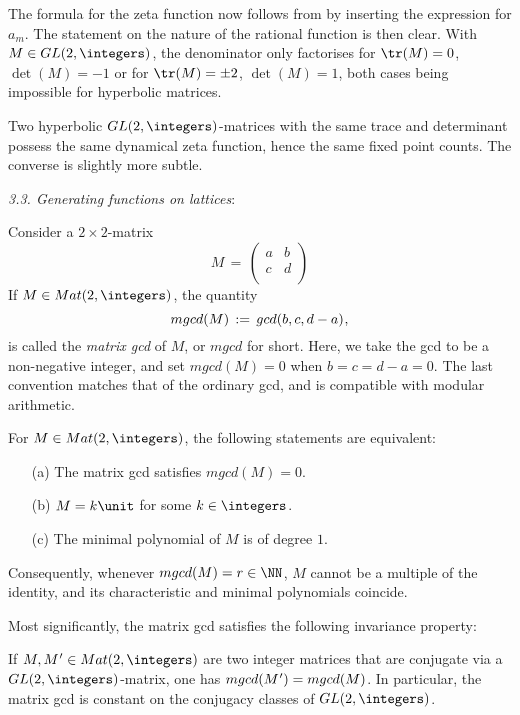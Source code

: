 {The formula for the zeta function now follows from 
by inserting the expression for $a_m$.
The statement on the nature of the rational
function is then clear. With $M\in GL (2,\integers)$, the denominator only
factorises for $\tr (M)=0$, $\det(M)=-1$ or for $\tr (M)=\pm 2$,
$\det(M)=1$, both cases being impossible for hyperbolic matrices.


Two hyperbolic
$GL (2,\integers)$-matrices with the same trace and determinant
possess the same dynamical zeta function, hence the same fixed point
counts. The converse is slightly more subtle.

\emph{3.3. Generating functions on lattices}:

Consider a $2\!\times\! 2$-matrix
\begin{equation} \label{two-matrices}
  M \, = \, \begin{pmatrix} a & b \\ c & d \\
    \end{pmatrix}
\end{equation}
   If $M\in{Mat} (2,\integers)$, the quantity
\[
   mgcd (M) \, := \, gcd (b,c,d-a) {\hspace{0.5pt}} ,
\]
is called the \emph{matrix gcd} of $M$, or $mgcd$ for
short.  Here, we take the gcd to be a non-negative
integer, and set $mgcd(M)=0$ when $b=c=d-a=0$.
The last convention matches that of the ordinary gcd,
and is compatible with modular arithmetic.

For $M\in{Mat} (2,\integers)$, the following statements are equivalent:
\begin{itemize}
\item[{\rm (a)}] The matrix gcd satisfies $mgcd(M)=0$.
\item[{\rm (b)}] $M=k\unit$ for some $k\in\integers$.
\item[{\rm (c)}] The minimal polynomial of $M$ is of degree $1$.
\end{itemize}
Consequently, whenever $mgcd(M)=r\in\NN$, $M$ cannot be a multiple
of the identity, and its characteristic and minimal polynomials
coincide.

Most significantly, the matrix gcd satisfies the following invariance
property:

    If $M,M^{{\hspace{0.5pt}}\prime}\in{Mat} (2,\integers)$ are two integer matrices that
    are conjugate via a $GL (2,\integers)$-matrix, one has
    $mgcd (M^{{\hspace{0.5pt}}\prime}) = mgcd (M)$. In particular, the matrix gcd
    is constant on the conjugacy classes
    of\/ $GL (2,\integers)$.

}
